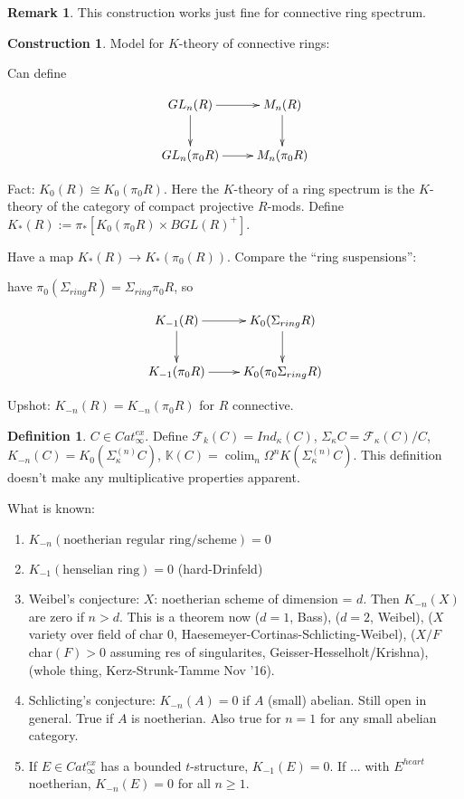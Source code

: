 \documentclass[letterpaper]{article}
\theoremstyle{definition}
\newtheorem{definition}[lemma]{Definition}
\newtheorem{remark}[lemma]{Remark}
\newtheorem{construction}{Construction}
\newcommand{\mbb}{\mathbb}
\newcommand{\mc}{\mathcal}
\DeclareMathOperator*{\colim}{colim}
\begin{document}
\begin{remark}
This construction works just fine for connective ring spectrum. 
\end{remark}

\begin{construction}
Model for $K$-theory of connective rings: 

Can define

\[
\xymatrix{GL_n(R) \ar[r]\ar[d] & M_n(R) \ar[d] \\ GL_n(\pi_0R) \ar[r]
  & M_n(\pi_0R)}
\]

Fact: $K_0(R) \cong K_0(\pi_0 R)$. Here the $K$-theory of a ring
spectrum is the $K$-theory of the category of compact projective $R$-mods.
Define $K_*(R) := \pi_*[K_0(\pi_0R) \times BGL(R)^+]$.

Have a map $K_*(R) \rightarrow K_*(\pi_0(R))$. Compare the ``ring
suspensions'':

have $\pi_0(\Sigma_{ring} R) = \Sigma_{ring} \pi_0R$, so 

\[
\xymatrix{K_{-1}(R) \ar[r]\ar[d] & K_0(\Sigma_{ring}R)
\ar[d]\\K_{-1}(\pi_0R) \ar[r] &K_0(\pi_0\Sigma_{ring}R)}
\]

Upshot: $K_{-n}(R) = K_{-n}(\pi_0R)$ for $R$ connective. 
\end{construction}

\begin{definition}
$C \in Cat_{\infty}^{ex}$. Define $\mc F_k(C) = Ind_\kappa(C)$,
$\Sigma_\kappa C = \mc F_\kappa (C)/C$, $K_{-n}(C) =
K_0(\Sigma_\kappa^{(n)} C)$, $\mbb K(C) = \colim_n \Omega^n
K(\Sigma^{(n)}_\kappa C)$. This definition doesn't make any
multiplicative properties apparent. 
\end{definition}

What is known:

\begin{enumerate}
\item $K_{-n}(\text{noetherian regular ring/scheme}) = 0$
\item $K_{-1}(\text{henselian ring}) = 0$ (hard-Drinfeld)
\item Weibel's conjecture: $X$: noetherian scheme of dimension =
  $d$. Then $K_{-n}(X)$ are zero if $n > d$. This is a theorem now ($d
  = 1$, Bass), ($d = 2$, Weibel), ($X$ variety over field of char 0,
  Haesemeyer-Cortinas-Schlicting-Weibel), ($X/F$ char$(F) > 0$
  assuming res of singularites, Geisser-Hesselholt/Krishna), (whole
  thing, Kerz-Strunk-Tamme Nov '16).
\item Schlicting's conjecture: $K_{-n}(A) = 0$ if $A$ (small)
  abelian. Still open in general. True if $A$ is noetherian. Also true
  for $n = 1$ for any small abelian category. 
\item If $E \in Cat_\infty^{ex}$ has a bounded $t$-structure,
  $K_{-1}(E) = 0$. If ... with $E^{heart}$ noetherian, $K_{-n}(E) =
  0$ for all $n \geq 1$. 
\end{enumerate}
\end{document}
